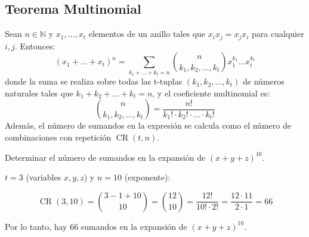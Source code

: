 \documentclass[a4paper,12pt]{article}
\begin{document}
\subsection{Teorema Multinomial}

\begin{procedimiento}[title=Teorema multinomial (Binomio de Newton generalizado)]
Sean $n \in \mathbb{N}$ y $x_1, \dots, x_t$ elementos de un anillo tales que $x_i x_j = x_j x_i$ para cualquier $i, j$. Entonces:
\[
(x_1 + \dots + x_t)^n = \sum_{k_1 + \dots + k_t = n} \binom{n}{k_1, k_2, \dots, k_t} x_1^{k_1} \dots x_t^{k_t}
\]
donde la suma se realiza sobre todas las t-tuplas $(k_1, k_2, \dots, k_t)$ de números naturales tales que $k_1 + k_2 + \dots + k_t = n$, y el coeficiente multinomial es:
\[
\binom{n}{k_1, k_2, \dots, k_t} = \frac{n!}{k_1! \cdot k_2! \cdot \dots \cdot k_t!}
\]
Además, el número de sumandos en la expresión se calcula como el número de combinaciones con repetición $\operatorname{CR}(t,n)$.
\end{procedimiento}

\begin{ejemplo}[title=Ejemplo: Número de sumandos de $(x + y + z)^{10}$]
Determinar el número de sumandos en la expansión de $(x + y + z)^{10}$.

\vspace{0.5em}

$t = 3$ (variables $x, y, z$) y $n = 10$ (exponente):

\[
\operatorname{CR}(3,10) = \binom{3-1+10}{10} = \binom{12}{10} = \frac{12!}{10! \cdot 2!} = \frac{12 \cdot 11}{2 \cdot 1} = 66
\]

Por lo tanto, hay 66 sumandos en la expansión de $(x + y + z)^{10}$.
\end{ejemplo}
\end{document}
